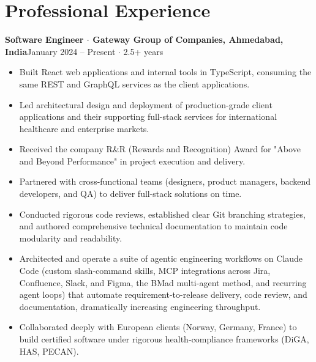 \documentclass[a4paper,10pt]{article}
\newcommand{\entry}[2]{\textbf{#1}\hfill{\small #2}\par}
\begin{document}
\section*{Professional Experience}
\entry{Software Engineer $\cdot$ Gateway Group of Companies, Ahmedabad, India}{January 2024 -- Present $\cdot$ 2.5+ years}
\begin{itemize}
  \item Built React web applications and internal tools in TypeScript, consuming the same REST and GraphQL services as the client applications.
  \item Led architectural design and deployment of production-grade client applications and their supporting full-stack services for international healthcare and enterprise markets.
  \item Received the company R\&R (Rewards and Recognition) Award for "Above and Beyond Performance" in project execution and delivery.
  \item Partnered with cross-functional teams (designers, product managers, backend developers, and QA) to deliver full-stack solutions on time.
  \item Conducted rigorous code reviews, established clear Git branching strategies, and authored comprehensive technical documentation to maintain code modularity and readability.
  \item Architected and operate a suite of agentic engineering workflows on Claude Code (custom slash-command skills, MCP integrations across Jira, Confluence, Slack, and Figma, the BMad multi-agent method, and recurring agent loops) that automate requirement-to-release delivery, code review, and documentation, dramatically increasing engineering throughput.
  \item Collaborated deeply with European clients (Norway, Germany, France) to build certified software under rigorous health-compliance frameworks (DiGA, HAS, PECAN).
\end{itemize}
\end{document}
